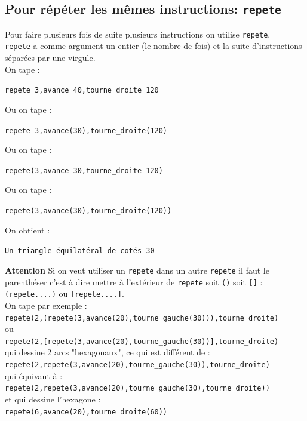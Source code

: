 \documentclass[a4paper,11pt]{book}
\begin{document}
\subsection{Pour r\'ep\'eter les m\^emes instructions: {\tt repete}}
Pour faire plusieurs fois de suite plusieurs instructions on utilise 
{\tt repete}.\\
{\tt repete} a comme argument un entier (le nombre de fois) et la suite 
d'instructions s\'epar\'ees par une virgule.\\
On tape :
\begin{center}{\tt repete 3,avance 40,tourne\_droite 120 }\end{center}
Ou on tape :
\begin{center}{\tt repete 3,avance(30),tourne\_droite(120)}\end{center}
Ou on tape :
\begin{center}{\tt repete(3,avance 30,tourne\_droite 120)}\end{center}
Ou on tape :
\begin{center}{\tt repete(3,avance(30),tourne\_droite(120))}\end{center}
On obtient :
\begin{center}{\tt Un triangle \'equilat\'eral de cot\'es 30}\end{center}
{\bf Attention}
Si on veut utiliser un {\tt repete} dans un autre {\tt repete} il faut le 
parenth\'eser c'est \`a dire mettre \`a l'ext\'erieur de {\tt repete} soit 
{\tt ()} soit {\tt []} : {\tt (repete....)} ou {\tt [repete....]}.\\
On tape par exemple :\\
{\tt repete(2,(repete(3,avance(20),tourne\_gauche(30))),tourne\_droite)}\\
ou\\
{\tt repete(2,[repete(3,avance(20),tourne\_gauche(30))],tourne\_droite)}\\
qui dessine 2 arcs "hexagonaux", ce qui est diff\'erent de :\\
{\tt repete(2,repete(3,avance(20),tourne\_gauche(30)),tourne\_droite)}\\
qui \'equivaut \`a :\\
{\tt repete(2,repete(3,avance(20),tourne\_gauche(30),tourne\_droite))}\\
et qui dessine l'hexagone :\\
{\tt repete(6,avance(20),tourne\_droite(60))}
\end{document}
